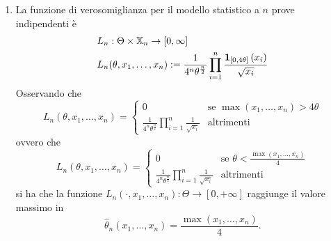 \begin{soluzione}
  \begin{enumerate}
  \item La funzione di verosomiglianza per il modello statistico a
    \(n\) prove indipendenti è
    \begin{align*}
      & L_n : \Theta \times \mathbb{X}_n \to [0, \infty] \\
      & L_n (\theta, x_1, \dots{}, x_n) := \frac{1}{4^n\theta^{\frac{n}{2}}}
        \prod_{i = 1}^n \frac{\mathbf 1_{[0, 4\theta]}\left(x_i\right)}{\sqrt{x_i}}
    \end{align*}
    Osservando che
    \[
      L_n(\theta, x_1, \dots{}, x_n) =
      \begin{cases}
        0 & \text{se } \max \left(x_1, \dots{}, x_n\right) > 4\theta \\
        \frac{1}{4^n\theta^{\frac{n}{2}}}
        \prod_{i = 1}^n \frac{1}{\sqrt{x_i}} & \text{altrimenti}        
      \end{cases}
    \]
    ovvero che
    \[
      L_n(\theta, x_1, \dots{}, x_n) =
      \begin{cases}
        0 & \text{se } \theta < \frac{\max \left(x_1, \dots{}, x_n\right)}{4} \\
        \frac{1}{4^n\theta^{\frac{n}{2}}}
        \prod_{i = 1}^n \frac{1}{\sqrt{x_i}} & \text{altrimenti}        
      \end{cases}
    \]
    si ha che la funzione
    \(L_n(\cdot, x_1, \dots{}, x_n) : \Theta \to [0, +\infty]\)
    raggiunge il valore massimo in
    \[
      \hat \theta_n (x_1, \dots{}, x_n) = \frac{\max \left(x_1,
          \dots{}, x_n\right)}{4} .
    \]
    

\end{enumerate}
\end{soluzione}
